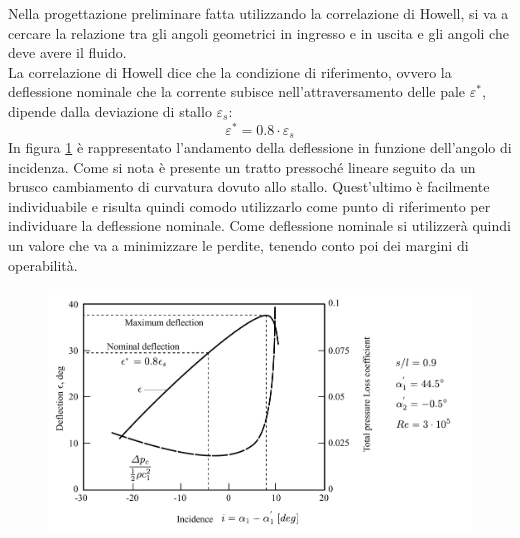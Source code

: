 Nella progettazione preliminare fatta utilizzando la correlazione di Howell, si va a cercare la relazione tra gli angoli geometrici in ingresso e in uscita e gli angoli che deve avere il fluido.\\
La correlazione di Howell dice che la condizione di riferimento, ovvero la deflessione nominale che la corrente subisce nell'attraversamento delle pale $\varepsilon^*$, dipende dalla deviazione di stallo $\varepsilon_s$:
\begin{equation}
\varepsilon^* = 0.8 \cdot \varepsilon_s
\end{equation}
In figura \ref{fig:Howell} è rappresentato l'andamento della deflessione in funzione dell'angolo di incidenza. Come si nota è presente un tratto pressoché lineare seguito da un brusco cambiamento di curvatura dovuto allo stallo. Quest'ultimo è facilmente individuabile e risulta quindi comodo utilizzarlo come punto di riferimento per individuare la deflessione nominale. Come deflessione nominale si utilizzerà quindi un valore che va a minimizzare le perdite, tenendo conto poi dei margini di operabilità.  
\begin{figure}
\centering
  \includegraphics[width=\textwidth]{fig/Howell.pdf}
\caption{}
\label{fig:Howell}
\end{figure}

